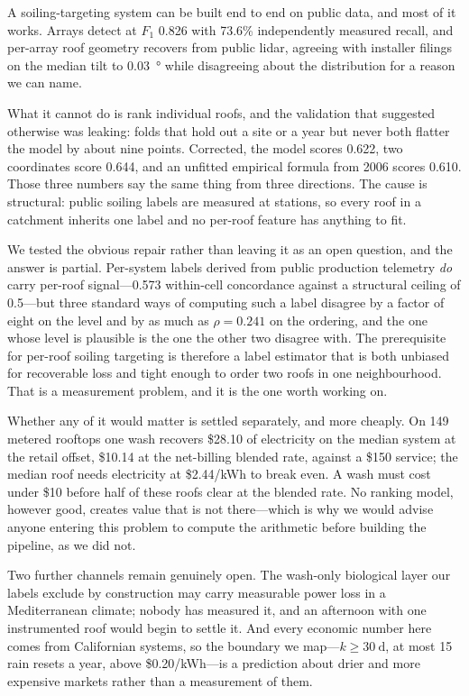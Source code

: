 \documentclass[10pt,twocolumn]{article}
\begin{document}
A soiling-targeting system can be built end to end on public data, and most of it works.
Arrays detect at $F_1$ 0.826 with 73.6\% independently measured recall, and per-array roof
geometry recovers from public lidar, agreeing with installer filings on the median tilt to
\SI{0.03}{\degree} while disagreeing about the distribution for a reason we can name.

What it cannot do is rank individual roofs, and the validation that suggested otherwise
was leaking: folds that hold out a site or a year but never both flatter the model by about
nine points. Corrected, the model scores 0.622, two coordinates score 0.644, and an
unfitted empirical formula from 2006 scores 0.610. Those three numbers say the same thing
from three directions. The cause is structural: public soiling labels are measured at
stations, so every roof in a catchment inherits one label and no per-roof feature has
anything to fit.

We tested the obvious repair rather than leaving it as an open question, and the answer is
partial. Per-system labels derived from public production telemetry \emph{do} carry
per-roof signal---0.573 within-cell concordance against a structural ceiling of 0.5---but
three standard ways of computing such a label disagree by a factor of eight on the level
and by as much as $\rho = 0.241$ on the ordering, and the one whose level is plausible is
the one the other two disagree with. The prerequisite for per-roof soiling targeting is therefore a label
estimator that is both unbiased for recoverable loss and tight enough to order two roofs in
one neighbourhood. That is a measurement problem, and it is the one worth working on.

Whether any of it would matter is settled separately, and more cheaply. On 149 metered
rooftops one wash recovers \$28.10 of electricity on the median system at the retail
offset, \$10.14 at the net-billing blended rate, against a \$150 service; the median roof needs
electricity at \$2.44/kWh to break even. A wash must cost under \$10 before half of these
roofs clear at the blended rate. No ranking model, however good, creates
value that is not there---which is why we would advise anyone entering this problem to
compute the arithmetic before building the pipeline, as we did not.

Two further channels remain genuinely open. The wash-only biological layer our labels
exclude by construction may carry measurable power loss in a Mediterranean climate; nobody
has measured it, and an afternoon with one instrumented roof would begin to settle it. And
every economic number here comes from Californian systems, so the boundary we map---$k \geq
\SI{30}{\day}$, at most 15 rain resets a year, above \$0.20/kWh---is a prediction about
drier and more expensive markets rather than a measurement of them.
\end{document}
